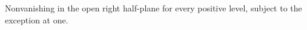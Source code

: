 \begin{definition}
\label{half}
\leanok
Nonvanishing in the open right half-plane for every positive level, subject to the exception at one.
\end{definition}

